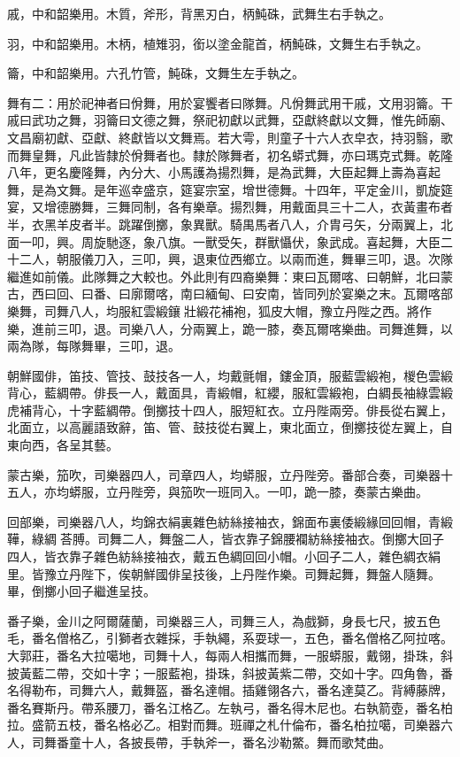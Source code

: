 \begin{pinyinscope}
戚，中和韶樂用。木質，斧形，背黑刃白，柄魨硃，武舞生右手執之。

羽，中和韶樂用。木柄，植雉羽，銜以塗金龍首，柄魨硃，文舞生右手執之。

籥，中和韶樂用。六孔竹管，魨硃，文舞生左手執之。

舞有二：用於祀神者曰佾舞，用於宴饗者曰隊舞。凡佾舞武用干戚，文用羽籥。干戚曰武功之舞，羽籥曰文德之舞，祭祀初獻以武舞，亞獻終獻以文舞，惟先師廟、文昌廟初獻、亞獻、終獻皆以文舞焉。若大雩，則童子十六人衣皁衣，持羽翳，歌而舞皇舞，凡此皆隸於佾舞者也。隸於隊舞者，初名蟒式舞，亦曰瑪克式舞。乾隆八年，更名慶隆舞，內分大、小馬護為揚烈舞，是為武舞，大臣起舞上壽為喜起舞，是為文舞。是年巡幸盛京，筵宴宗室，增世德舞。十四年，平定金川，凱旋筵宴，又增德勝舞，三舞同制，各有樂章。揚烈舞，用戴面具三十二人，衣黃畫布者半，衣黑羊皮者半。跳躍倒擲，象異獸。騎禺馬者八人，介胄弓矢，分兩翼上，北面一叩，興。周旋馳逐，象八旗。一獸受矢，群獸懾伏，象武成。喜起舞，大臣二十二人，朝服儀刀入，三叩，興，退東位西鄉立。以兩而進，舞畢三叩，退。次隊繼進如前儀。此隊舞之大較也。外此則有四裔樂舞：東曰瓦爾喀、曰朝鮮，北曰蒙古，西曰回、曰番、曰廓爾喀，南曰緬甸、曰安南，皆同列於宴樂之末。瓦爾喀部樂舞，司舞八人，均服紅雲緞鑲壯緞花補袍，狐皮大帽，豫立丹陛之西。將作樂，進前三叩，退。司樂八人，分兩翼上，跪一膝，奏瓦爾喀樂曲。司舞進舞，以兩為隊，每隊舞畢，三叩，退。

朝鮮國俳，笛技、管技、鼓技各一人，均戴氈帽，鏤金頂，服藍雲緞袍，椶色雲緞背心，藍綢帶。俳長一人，戴面具，青緞帽，紅纓，服紅雲緞袍，白綢長袖綠雲緞虎補背心，十字藍綢帶。倒擲技十四人，服短紅衣。立丹陛兩旁。俳長從右翼上，北面立，以高麗語致辭，笛、管、鼓技從右翼上，東北面立，倒擲技從左翼上，自東向西，各呈其藝。

蒙古樂，笳吹，司樂器四人，司章四人，均蟒服，立丹陛旁。番部合奏，司樂器十五人，亦均蟒服，立丹陛旁，與笳吹一班同入。一叩，跪一膝，奏蒙古樂曲。

回部樂，司樂器八人，均錦衣絹裏雜色紡絲接袖衣，錦面布裏倭緞緣回回帽，青緞鞾，綠綢荅膊。司舞二人，舞盤二人，皆衣靠子錦腰襴紡絲接袖衣。倒擲大回子四人，皆衣靠子雜色紡絲接袖衣，戴五色綢回回小帽。小回子二人，雜色綢衣絹里。皆豫立丹陛下，俟朝鮮國俳呈技後，上丹陛作樂。司舞起舞，舞盤人隨舞。畢，倒擲小回子繼進呈技。

番子樂，金川之阿爾薩蘭，司樂器三人，司舞三人，為戲獅，身長七尺，披五色毛，番名僧格乙，引獅者衣雜採，手執繩，系耍球一，五色，番名僧格乙阿拉喀。大郭莊，番名大拉噶地，司舞十人，每兩人相攜而舞，一服蟒服，戴翎，掛珠，斜披黃藍二帶，交如十字；一服藍袍，掛珠，斜披黃紫二帶，交如十字。四角魯，番名得勒布，司舞六人，戴舞盔，番名達帽。插雞翎各六，番名達莫乙。背縛藤牌，番名賽斯丹。帶系腰刀，番名江格乙。左執弓，番名得木尼也。右執箭壺，番名柏拉。盛箭五枝，番名格必乙。相對而舞。班禪之札什倫布，番名柏拉噶，司樂器六人，司舞番童十人，各披長帶，手執斧一，番名沙勒鱉。舞而歌梵曲。


\end{pinyinscope}

